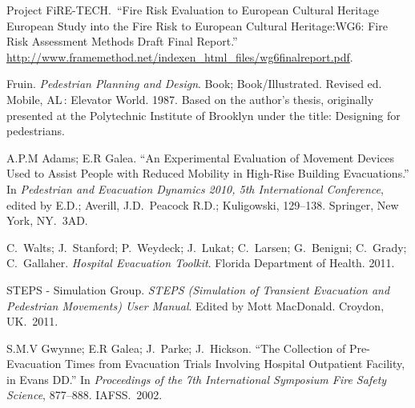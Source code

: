 \documentclass{style/llncs}
\begin{document}
{\begin{thebibliography}{36}
Project FiRE-TECH.~\textquotedblleft{}Fire Risk Evaluation to European Cultural Heritage European Study into the Fire Risk to European Cultural Heritage:WG6: Fire Risk Assessment Methods Draft Final Report.\textquotedblright{} \href{http://www.framemethod.net/indexen_html_files/wg6finalreport.pdf}{{\ttfamily http://\hspace{0pt}www.\hspace{0pt}framemethod.\hspace{0pt}net/\hspace{0pt}indexen\_\hspace{0pt}html\_\hspace{0pt}files/\hspace{0pt}wg6finalreport.\hspace{0pt}pdf}}.\label{29}%

Fruin. \emph{Pedestrian Planning and Design}. Book; Book/Illustrated. Revised ed. Mobile, AL : Elevator World. 1987. Based on the author’s thesis, originally presented at the Polytechnic Institute of Brooklyn under the title: Designing for pedestrians.\label{22}%

A.P.M Adams; E.R Galea. \textquotedblleft{}An Experimental Evaluation of Movement Devices Used to Assist People with Reduced Mobility in High-Rise Building Evacuations.\textquotedblright{} In \emph{Pedestrian and Evacuation Dynamics 2010, 5th International Conference}, edited by E.D.; Averill, J.D.~Peacock R.D.; Kuligowski, 129–138. Springer, New York, NY.~3AD.\label{20}%

C.~Walts; J.~Stanford; P.~Weydeck; J.~Lukat; C.~Larsen; G.~Benigni; C.~Grady; C.~Gallaher. \emph{Hospital Evacuation Toolkit}. Florida Department of Health. 2011.\label{37}%

STEPS - Simulation Group. \emph{STEPS (Simulation of Transient Evacuation and Pedestrian Movements) User Manual}. Edited by Mott MacDonald. Croydon, UK.~2011.\label{16}%

S.M.V Gwynne; E.R Galea; J.~Parke; J.~Hickson. \textquotedblleft{}The Collection of Pre-Evacuation Times from Evacuation Trials Involving Hospital Outpatient Facility, in Evans DD.\textquotedblright{} In \emph{Proceedings of the 7th International Symposium Fire Safety Science}, 877–888. IAFSS.~2002.\label{35}%


\end{thebibliography}}
\end{document}
